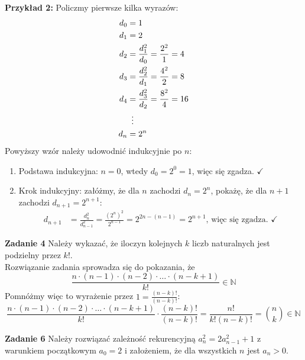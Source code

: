 \documentclass[a4paper,12pt]{article}
\begin{document}
\noindent \newline \textbf{Przykład 2:} Policzmy pierwsze kilka wyrazów:
\begin{align*}
	d_0 &= 1 \\
	d_1 &= 2 \\
	d_2 &= \frac{d_1^2}{d_0} = \frac{2^2}{1} = 4	\\
	d_3 &= \frac{d_2^2}{d_1} = \frac{4^2}{2} = 8 	\\
	d_4 &= \frac{d_3^2}{d_2} = \frac{8^2}{4} = 16	\\
		&\enskip \vdots \\
	d_n &= 2^n
\end{align*}
Powyższy wzór należy udowodnić indukcyjnie po $n$:
\begin{enumerate}
	\item Podstawa indukcyjna: $n = 0$, wtedy $d_0 = 2^0 = 1$, więc się zgadza. $\checkmark$
	\item Krok indukcyjny: załóżmy, że dla $n$ zachodzi $d_n = 2^n$, pokażę, że dla $n+1$ zachodzi $d_{n+1} = 2^{n+1}$:
	\begin{align*}
		d_{n+1} &= \frac{d_n^2}{d_{n-1}^2} = \frac{\left(2^n\right)^2}{2^{n-1}} = 2^{2n - (n - 1)} = 2^{n + 1} \text{, więc się zgadza. } \checkmark
	\end{align*}
\end{enumerate}

\noindent \newline \textbf{Zadanie 4} \newline
Należy wykazać, że iloczyn kolejnych $k$ liczb naturalnych jest podzielny przez $k!$.\\

\noindent Rozwiązanie zadania sprowadza się do pokazania, że
\[ \frac{n \cdot (n-1) \cdot (n-2) \cdot \ldots \cdot (n-k+1)}{k!} \in \mathbb{N} \]
Pomnóżmy więc to wyrażenie przez $1 = \frac{(n-k)!}{(n-k)!}$:
\[ \frac{n \cdot (n-1) \cdot (n-2) \cdot \ldots \cdot (n-k+1)}{k!} \cdot \frac{(n-k)!}{(n-k)!} = \frac{n!}{k!(n-k)!} = \binom{n}{k} \in \mathbb{N} \]

\newpage
\noindent \textbf{Zadanie 6} \newline
Należy rozwiązać zależność rekurencyjną $a_n^2 = 2 a_{n-1}^2 + 1$ z warunkiem początkowym $a_0 = 2$ i założeniem, że dla wszystkich $n$ jest $a_n > 0$. \\
\end{document}
